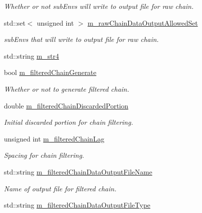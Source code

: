 \begin{DoxyCompactItemize}
\begin{DoxyCompactList}\small\item\em Whether or not sub\-Envs will write to output file for raw chain. \end{DoxyCompactList}\item 
std\-::set$<$ unsigned int $>$ \hyperlink{class_q_u_e_s_o_1_1_m_l_sampling_level_options_ae5c2fe5b90eda78e17ccfbf3dbcfcc89}{m\-\_\-raw\-Chain\-Data\-Output\-Allowed\-Set}
\begin{DoxyCompactList}\small\item\em sub\-Envs that will write to output file for raw chain. \end{DoxyCompactList}\item 
std\-::string \hyperlink{class_q_u_e_s_o_1_1_m_l_sampling_level_options_a399d93049d7862d47c8ac68e1885d0c9}{m\-\_\-str4}
\item 
bool \hyperlink{class_q_u_e_s_o_1_1_m_l_sampling_level_options_a878542ef3504c843b50e0bd5efd0c078}{m\-\_\-filtered\-Chain\-Generate}
\begin{DoxyCompactList}\small\item\em Whether or not to generate filtered chain. \end{DoxyCompactList}\item 
double \hyperlink{class_q_u_e_s_o_1_1_m_l_sampling_level_options_a22220cb7fbdef58a009733f8cf1887f9}{m\-\_\-filtered\-Chain\-Discarded\-Portion}
\begin{DoxyCompactList}\small\item\em Initial discarded portion for chain filtering. \end{DoxyCompactList}\item 
unsigned int \hyperlink{class_q_u_e_s_o_1_1_m_l_sampling_level_options_a6740efa52d4f8ec112be817f5220cf94}{m\-\_\-filtered\-Chain\-Lag}
\begin{DoxyCompactList}\small\item\em Spacing for chain filtering. \end{DoxyCompactList}\item 
std\-::string \hyperlink{class_q_u_e_s_o_1_1_m_l_sampling_level_options_abf333c405ee097104ee9b1b1e92ecd97}{m\-\_\-filtered\-Chain\-Data\-Output\-File\-Name}
\begin{DoxyCompactList}\small\item\em Name of output file for filtered chain. \end{DoxyCompactList}\item 
std\-::string \hyperlink{class_q_u_e_s_o_1_1_m_l_sampling_level_options_a154ba7fd5c2fbc98af0ac91bb022a232}{m\-\_\-filtered\-Chain\-Data\-Output\-File\-Type}

\end{DoxyCompactItemize}
